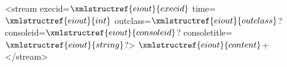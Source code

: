<stream execid=$\xmlstructref{eiout}{execid}$ time=$\xmlstructref{eiout}{int}$ outclass=$\xmlstructref{eiout}{outclass}$? consoleid=$\xmlstructref{eiout}{consoleid}$? consoletitle=$\xmlstructref{eiout}{string}$?>
  $\xmlstructref{eiout}{content}$+
</stream>

